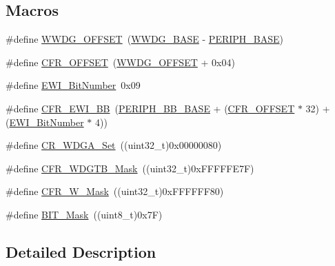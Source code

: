 \subsection*{Macros}
\begin{DoxyCompactItemize}
\item 
\#define \hyperlink{group___w_w_d_g___private___defines_gab6dcdf2385dd7317ec775e146cff40ca}{W\+W\+D\+G\+\_\+\+O\+F\+F\+S\+ET}~(\hyperlink{group___peripheral__memory__map_ga9a5bf4728ab93dea5b569f5b972cbe62}{W\+W\+D\+G\+\_\+\+B\+A\+SE} -\/ \hyperlink{group___peripheral__memory__map_ga9171f49478fa86d932f89e78e73b88b0}{P\+E\+R\+I\+P\+H\+\_\+\+B\+A\+SE})
\item 
\#define \hyperlink{group___w_w_d_g___private___defines_ga3e0f9d9f7f69a6d133bba721e25aca4a}{C\+F\+R\+\_\+\+O\+F\+F\+S\+ET}~(\hyperlink{group___w_w_d_g___private___defines_gab6dcdf2385dd7317ec775e146cff40ca}{W\+W\+D\+G\+\_\+\+O\+F\+F\+S\+ET} + 0x04)
\item 
\#define \hyperlink{group___w_w_d_g___private___defines_ga97c9005823520f5aaefe211923b48215}{E\+W\+I\+\_\+\+Bit\+Number}~0x09
\item 
\#define \hyperlink{group___w_w_d_g___private___defines_gaa48804210cea547f0e0f4ca49c44fc94}{C\+F\+R\+\_\+\+E\+W\+I\+\_\+\+BB}~(\hyperlink{group___peripheral__memory__map_gaed7efc100877000845c236ccdc9e144a}{P\+E\+R\+I\+P\+H\+\_\+\+B\+B\+\_\+\+B\+A\+SE} + (\hyperlink{group___w_w_d_g___private___defines_ga3e0f9d9f7f69a6d133bba721e25aca4a}{C\+F\+R\+\_\+\+O\+F\+F\+S\+ET} $\ast$ 32) + (\hyperlink{group___w_w_d_g___private___defines_ga97c9005823520f5aaefe211923b48215}{E\+W\+I\+\_\+\+Bit\+Number} $\ast$ 4))
\item 
\#define \hyperlink{group___w_w_d_g___private___defines_ga4c66a66daa0e09782e8b2248db9b35f6}{C\+R\+\_\+\+W\+D\+G\+A\+\_\+\+Set}~((uint32\+\_\+t)0x00000080)
\item 
\#define \hyperlink{group___w_w_d_g___private___defines_ga2b74f53d33f15b272b2d1ef78a78a2cc}{C\+F\+R\+\_\+\+W\+D\+G\+T\+B\+\_\+\+Mask}~((uint32\+\_\+t)0x\+F\+F\+F\+F\+F\+E7\+F)
\item 
\#define \hyperlink{group___w_w_d_g___private___defines_gac00816db9fe6715f702b4f7d6085ce30}{C\+F\+R\+\_\+\+W\+\_\+\+Mask}~((uint32\+\_\+t)0x\+F\+F\+F\+F\+F\+F80)
\item 
\#define \hyperlink{group___w_w_d_g___private___defines_ga01a4e07e98e933af78671f65a49bd836}{B\+I\+T\+\_\+\+Mask}~((uint8\+\_\+t)0x7\+F)
\end{DoxyCompactItemize}


\subsection{Detailed Description}


